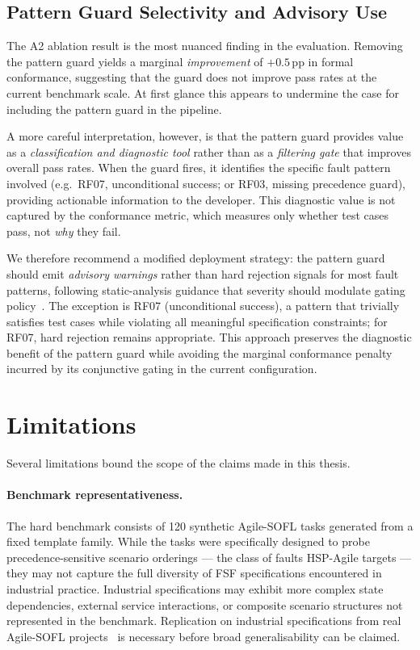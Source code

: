 \subsection{Pattern Guard Selectivity and Advisory Use}

The A2 ablation result is the most nuanced finding in the evaluation.  Removing the pattern
guard yields a marginal \emph{improvement} of $+0.5$\,pp in formal conformance, suggesting
that the guard does not improve pass rates at the current benchmark scale.  At first glance
this appears to undermine the case for including the pattern guard in the pipeline.

A more careful interpretation, however, is that the pattern guard provides value as a
\emph{classification and diagnostic tool} rather than as a \emph{filtering gate} that
improves overall pass rates.  When the guard fires, it identifies the specific fault pattern
involved (e.g.\ RF07, unconditional success; or RF03, missing precedence guard), providing
actionable information to the developer.  This diagnostic value is not captured by the
conformance metric, which measures only whether test cases pass, not \emph{why} they fail.

We therefore recommend a modified deployment strategy: the pattern guard should emit
\emph{advisory warnings} rather than hard rejection signals for most fault patterns,
following static-analysis guidance that severity should modulate gating policy~\citep{hovemeyer2004findbugs,ayewah2008findbugs}.
The exception is RF07 (unconditional success), a pattern that trivially satisfies test cases
while violating all meaningful specification constraints; for RF07, hard rejection remains
appropriate.  This approach preserves the diagnostic benefit of the pattern guard while
avoiding the marginal conformance penalty incurred by its conjunctive gating in the current
configuration.

\section{Limitations}
\label{sec:disc:limitations}

Several limitations bound the scope of the claims made in this thesis.

\paragraph{Benchmark representativeness.}
The hard benchmark consists of 120 synthetic Agile-SOFL tasks generated from a fixed
template family.  While the tasks were specifically designed to probe precedence-sensitive
scenario orderings — the class of faults HSP-Agile targets — they may not capture the full
diversity of FSF specifications encountered in industrial practice.  Industrial
specifications may exhibit more complex state dependencies, external service interactions,
or composite scenario structures not represented in the benchmark.  Replication on
industrial specifications from real Agile-SOFL projects~\citep{li2022agilesofl,pohl2010requirements} is necessary before broad
generalisability can be claimed.

